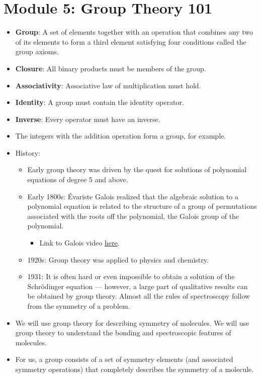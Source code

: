 \documentclass[../main.tex]{subfiles}
\begin{document}
\section{Module 5: Group Theory 101}
\begin{itemize}
    \item {}\textbf{Group}: A set of elements together with an operation that combines any two of its elements to form a third element satisfying four conditions called the group axioms.
    \item \textbf{Closure}: All binary products must be members of the group.
    \item \textbf{Associativity}: Associative law of multiplication must hold.
    \item \textbf{Identity}: A group must contain the identity operator.
    \item \textbf{Inverse}: Every operator must have an inverse.
    \item The integers with the addition operation form a group, for example.
    \item History:
    \begin{itemize}
        \item Early group theory was driven by the quest for solutions of polynomial equations of degree 5 and above.
        \item Early 1800s: \'{E}variste Galois realized that the algebraic solution to a polynomial equation is related to the structure of a group of permutations associated with the roots off the polynomial, the Galois group of the polynomial.
        \begin{itemize}
            \item Link to Galois video \href{https://www.youtube.com/watch?v=Ct2fyigNgPY}{here}.
        \end{itemize}
        \item 1920s: Group theory was applied to physics and chemistry.
        \item 1931: It is often hard or even impossible to obtain a solution of the Schr\"{o}dinger equation --- however, a large part of qualitative results can be obtained by group theory. Almost all the rules of spectroscopy follow from the symmetry of a problem.
    \end{itemize}
    \item We will use group theory for describing symmetry of molecules. We will use group theory to understand the bonding and spectroscopic features of molecules.
    \item For us, a group consists of a set of symmetry elements (and associated symmetry operations) that completely describes the symmetry of a molecule.

\end{itemize}
\end{document}
